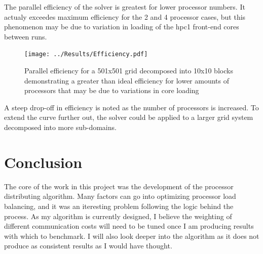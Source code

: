 \documentclass[twocolumn,10pt]{asme2ej}
\begin{document}
The parallel efficiency of the solver is greatest for lower processor numbers.  It actualy exceedes maximum efficiency for the 2 and 4 processor cases, but this phenomenon may be due to variation in loading of the hpc1 front-end cores between runs.

\begin{figure}[htb]
\begin{center}
\texttt{[image: ../Results/Efficiency.pdf]}
\caption{Parallel efficiency for a 501x501 grid decomposed into 10x10 blocks demonstrating a greater than ideal efficiency for lower amounts of processors that may be due to variations in core loading}
\label{Effish}
\end{center}
\end{figure}

A steep drop-off in efficiency is noted as the number of processors is increased.  To extend the curve further out, the solver could be applied to a larger grid system decomposed into more sub-domains.

\section{Conclusion}

The core of the work in this project was the development of the processor distributing algorithm.  Many factors can go into optimizing processor load balancing, and it was an iteresting problem following the logic behind the process.  As my algorithm is currently designed, I believe the weighting of different communication costs will need to be tuned once I am producing results with which to benchmark.  I will also look deeper into the algorithm as it does not produce as consistent results as I would have thought.

\end{document}
